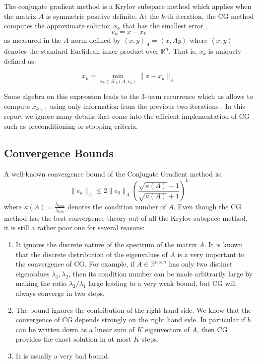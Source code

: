 \documentclass[10pt,a4paper]{article}
\def\<{\left\langle}
\def\>{\right\rangle}
\begin{document}
The conjugate gradient method is a Krylov subspace method which applies when the matrix $A$ is symmetric positive definite. At the $k$-th iteration, the CG method computes the approximate solution $x_k$ that has the smallest error
\begin{equation}
e_k = x- x_k 
\end{equation}
 as measured in the $A$-norm defined by $\< x, y \>_A = \< x, Ay \>$ where $\< x,y\>$ denotes the standard Euclidean inner product over $\mathbb{R}^n$. That is, $x_k$ is uniquely defined as:
 
 \begin{equation}
 x_k = \min_{x_k\in \mathcal{K}_k(A,r_0)} \| x - x_k \|_A
 \end{equation}

Some algebra on this expression leads to the 3-term recurrence which us allows to compute $x_{k+1}$ using only information from the previous two iterations . In this report we ignore many details that come into the efficient implementation of CG such as preconditioning or stopping criteria.

\subsection{Convergence Bounds}


A well-known convergence bound of the Conjugate Gradient method is:
\begin{equation} \label{eq:bound}
\| e_k \|_A \leq 2 \| e_0 \|_A \left( \frac{\sqrt{\kappa(A)} -1 }{\sqrt{\kappa(A)}+1} \right)^k
 \end{equation}
where $\kappa(A) = \frac{\lambda_{\text{max}}}{\lambda_{\text{min}}}$ denotes the condition number of $A$. Even though the CG method has the best convergence theory out of all the Krylov subspace method, it is still a rather poor one for several reasons:
\begin{enumerate}
\item It ignores the discrete nature of the spectrum of the matrix $A$. It is known that the discrete distribution of the eigenvalues of $A$ is a very important to the convergence of CG.  For example, if $A \in \mathbb{R}^{n \times n}$ has only two distinct eigenvalues $\lambda_1, \lambda_2$, then its condition number can be made arbitrarily large by making the ratio $ \lambda_2 / \lambda_1$ large leading to a very weak bound, but CG will always converge in two steps.
\item The bound ignores the contribution of the right hand side. We know that the convergence of CG depends strongly on the right hand side. In particular if $b$ can be written down as a linear sum of $K$ eigenvectors of $A$, then CG provides the exact solution in at most $K$ steps.
\item It is usually a very bad bound.
\end{enumerate}
\end{document}
